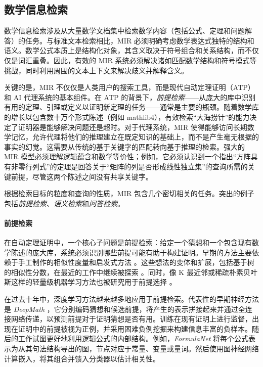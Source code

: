 \documentclass[11pt]{article}
\numberwithin{equation}{section}
\begin{document}
\subsection{数学信息检索}\label{subsec:mir}

数学信息检索涉及从大量数学文档集中检索数学内容（包括公式、定理和问题解答）的任务。与标准文本检索相比，MIR 必须明确考虑数学表达式独特的结构和语义。数学公式本质上是结构化对象，其含义取决于符号组合和关系结构，而不仅仅是词汇重叠。因此，有效的 MIR 系统必须解决诸如匹配数学结构和符号模式等挑战，同时利用周围的文本上下文来解决歧义并解释含义。

关键的是，MIR 不仅仅是人类用户的搜索工具，而是现代自动定理证明（ATP）和 AI 代理系统的基本组件。在 ATP 的背景下，\textit{前提检索}——从庞大的库中识别有用的定理、引理或定义以证明新定理的任务——通常是主要的瓶颈。随着数学库的增长以包含数十万个形式陈述（例如 mathlib4），有效检索“大海捞针”的能力决定了证明器是能够解决问题还是超时。对于代理系统，MIR 使得能够访问长期数学记忆，允许代理将他们的推理建立在既定知识的基础上，而不是产生毫无根据的事实的幻觉。这需要从传统的基于关键字的匹配转向基于推理的检索。强大的 MIR 模型必须理解逻辑蕴含和数学等价性；例如，它必须认识到一个指出“方阵具有非零行列式”的定理是回答关于“矩阵的列是否形成线性独立集”的查询所需的关键前提，尽管这两个陈述之间没有共享关键字。

根据检索目标的粒度和查询的性质，MIR 包含几个密切相关的任务。突出的例子包括\textit{前提检索}、\textit{语义检索}和\textit{问答检索}。

\paragraph{前提检索}

在自动定理证明中，一个核心子问题是前提检索：给定一个猜想和一个包含现有数学陈述的庞大库，系统必须识别哪些前提可能有助于构建证明。早期的方法主要依赖于手工制作的相似性度量和启发式方法 \cite{hoder2011sine,meng2009lightweight}。这些想法的变体和扩展，包括基于树的相似性分数，在最近的工作中继续被探索 \cite{wang2025treebased}。同时，像 K 最近邻或稀疏朴素贝叶斯这样的轻量级机器学习方法也被研究用于前提选择 \cite{czajka2018hammer}。

在过去十年中，深度学习方法越来越多地应用于前提检索。代表性的早期神经方法是 \textit{DeepMath} \cite{irving2016deepmath}，它分别编码猜想和候选前提，将产生的表示拼接起来并通过全连接网络传递，以预测前提对于证明猜想是否有用。训练在现有证明上进行监督，出现在证明中的前提被视为正例，并采用困难负例挖掘来构建信息丰富的负样本。随后的工作试图更好地利用逻辑公式的内部结构。例如，\textit{FormulaNet} \cite{wang2017premise} 将每个公式表示为从其句法结构导出的图，节点对应于常量、变量或量词。然后使用图神经网络计算嵌入，将其组合并馈入分类器以估计相关性。
\end{document}
